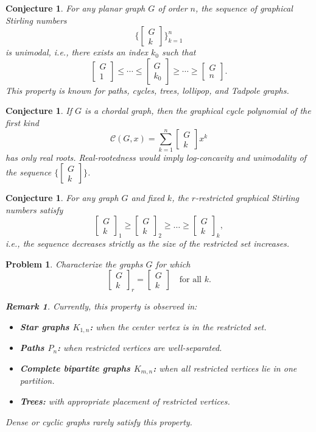 \documentclass{amsart}
\newtheorem{conjecture}[theorem]{Conjecture}
\newtheorem{problem}[theorem]{Problem}
\theoremstyle{definition}
\newtheorem{remark}[theorem]{Remark}
\def\st#1#2{\begin{bmatrix} #1 \\ #2 \end{bmatrix}}
\begin{document}
\begin{conjecture}
\label{conj:unimodal-planar}
For any planar graph $G$ of order $n$, the sequence of graphical Stirling numbers
\[
\{\st{G}{k}\}_{k=1}^n
\]
is \emph{unimodal}, i.e., there exists an index $k_0$ such that
\[
\st{G}{1} \le \cdots \le \st{G}{k_0} \ge \cdots \ge \st{G}{n}.
\]
This property is known for paths, cycles, trees, lollipop, and Tadpole graphs.
\end{conjecture}

\begin{conjecture}
\label{conj:real-rooted}
If $G$ is a chordal graph, then the graphical cycle polynomial of the first kind
\[
\mathcal{C}(G, x) = \sum_{k=1}^n \st{G}{k} x^k
\]
has only real roots. Real-rootedness would imply log-concavity and unimodality of the sequence $\{\st{G}{k}\}$.
\end{conjecture}

\begin{conjecture}
\label{conj:r-monotone}
For any graph $G$ and fixed $k$, the $r$-restricted graphical Stirling numbers satisfy
\[
\st{G}{k}_1 \ge \st{G}{k}_2 \ge \dots \ge \st{G}{k}_k,
\]
i.e., the sequence decreases strictly as the size of the restricted set increases.
\end{conjecture}

\begin{problem}
Characterize the graphs $G$ for which
\[
\st{G}{k}_r = \st{G}{k} \quad \text{for all } k.
\]
\begin{remark}
Currently, this property is observed in:
\begin{itemize}
    \item \textbf{Star graphs $K_{1,n}$:} when the center vertex is in the restricted set.
    \item \textbf{Paths $P_n$:} when restricted vertices are well-separated.
    \item \textbf{Complete bipartite graphs $K_{m,n}$:} when all restricted vertices lie in one partition.
    \item \textbf{Trees:} with appropriate placement of restricted vertices.
\end{itemize}
Dense or cyclic graphs rarely satisfy this property.
\end{remark}
\end{problem}
\end{document}
